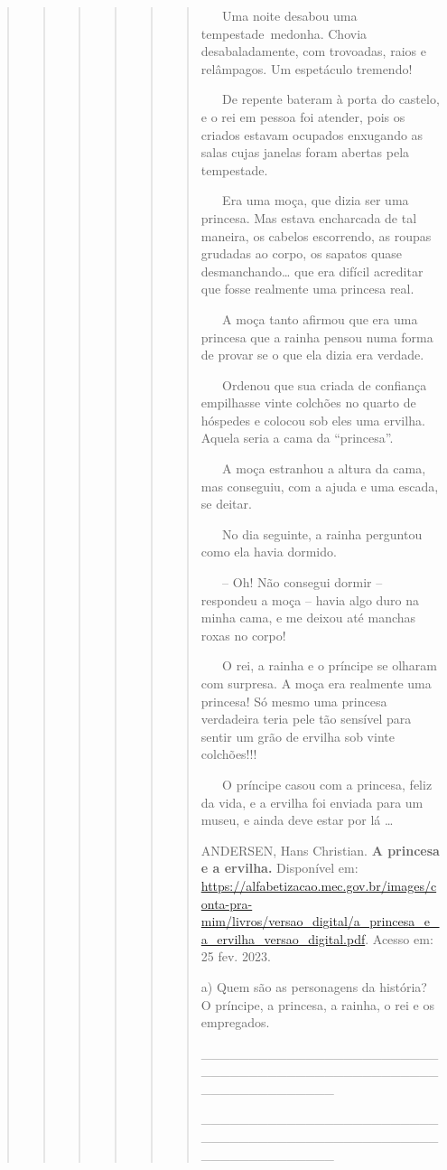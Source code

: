 \begin{quote}
\begin{quote}
\begin{quote}
\begin{quote}
\begin{quote}
\begin{quote}
~ ~ Uma noite desabou uma tempestade~medonha. Chovia desabaladamente,
com trovoadas, raios e relâmpagos. Um espetáculo tremendo!

~ ~ De repente bateram à porta do castelo, e o rei em pessoa foi
atender, pois os criados estavam ocupados enxugando as salas cujas
janelas foram abertas pela tempestade.

~ ~ Era uma moça, que dizia ser uma princesa. Mas estava encharcada de
tal maneira, os cabelos escorrendo, as roupas grudadas ao corpo, os
sapatos quase desmanchando\ldots{} que era difícil acreditar que fosse
realmente uma princesa real.

~ ~ A moça tanto afirmou que era uma princesa que a rainha pensou numa
forma de provar se o que ela dizia era verdade.

~ ~ Ordenou que sua criada de confiança empilhasse vinte colchões no
quarto de hóspedes e colocou sob eles uma ervilha. Aquela seria a cama
da ``princesa''.

~ ~ A moça estranhou a altura da cama, mas conseguiu, com a ajuda e uma
escada, se deitar.

~ ~ No dia seguinte, a rainha perguntou como ela havia dormido.

~ ~ -- Oh! Não consegui dormir -- respondeu a moça -- havia algo duro na
minha cama, e me deixou até manchas roxas no corpo!

~ ~ \protect\hypertarget{_Hlk128236047}{}{}O rei, a rainha e o príncipe
se olharam com surpresa. A moça era realmente uma princesa! Só mesmo uma
princesa verdadeira teria pele tão sensível para sentir um grão de
ervilha sob vinte colchões!!!

~ ~ O príncipe casou com a princesa, feliz da vida, e a ervilha foi
enviada para um museu, e ainda deve estar por lá \ldots{}

ANDERSEN, Hans Christian. \textbf{A princesa e a ervilha.} Disponível
em:
\url{https://alfabetizacao.mec.gov.br/images/conta-pra-mim/livros/versao_digital/a_princesa_e_a_ervilha_versao_digital.pdf}.
Acesso em: 25 fev. 2023.

a) Quem são as personagens da história? O príncipe, a princesa, a
rainha, o rei e os empregados.

\_\_\_\_\_\_\_\_\_\_\_\_\_\_\_\_\_\_\_\_\_\_\_\_\_\_\_\_\_\_\_\_\_\_\_\_\_\_\_\_\_\_\_\_\_\_\_\_\_\_\_\_\_\_\_\_\_\_\_\_\_\_\_\_

\_\_\_\_\_\_\_\_\_\_\_\_\_\_\_\_\_\_\_\_\_\_\_\_\_\_\_\_\_\_\_\_\_\_\_\_\_\_\_\_\_\_\_\_\_\_\_\_\_\_\_\_\_\_\_\_\_\_\_\_\_\_\_\_


\end{quote}
\end{quote}
\end{quote}
\end{quote}
\end{quote}
\end{quote}
